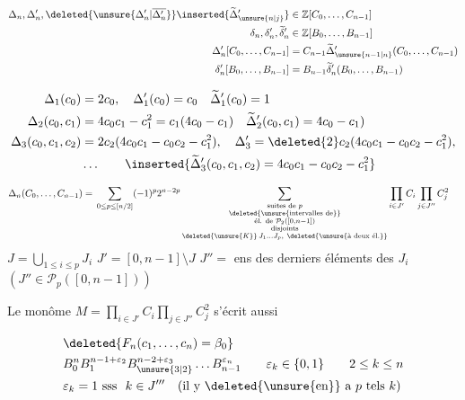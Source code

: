 \[
\begin{aligned}
\Delta_n,\Delta'_n,\deleted{\unsure{\Delta'_n|\overline{\Delta'_n}}}\inserted{\widetilde{\Delta}'_{\unsure{n|j}}}&\in\mathbb Z[C_0,\ldots,C_{n-1}]\\
\delta_n,\delta'_n,\widetilde{\delta}'_n&\in\mathbb Z[B_0,\ldots,B_{n-1}]\\
\Delta'_n[C_0,\ldots,C_{n-1}]&=C_{n-1}\widetilde{\Delta}'_{\unsure{n-1|n}}(C_0,\ldots,C_{n-1})\\
\delta'_n[B_0,\ldots,B_{n-1}]&=B_{n-1}\widetilde{\delta}'_n(B_0,\ldots,B_{n-1})
\end{aligned}
\]

\[
\begin{aligned}
\Delta_1(c_0)&=2c_0,\quad\Delta'_1(c_0)=c_0\quad\widetilde{\Delta}'_1(c_0)=1\\
\Delta_2(c_0,c_1)&=4c_0c_1-c_1^2=c_1(4c_0-c_1)\quad\widetilde{\Delta}'_2(c_0,c_1)=4c_0-c_1)\\
\Delta_3(c_0,c_1,c_2)&=2c_2(4c_0c_1-c_0c_2-c_1^2),\quad
\Delta'_3=\deleted{2}c_2(4c_0c_1-c_0c_2-c_1^2),\\
&\ldots\qquad\inserted{\widetilde{\Delta}'_3(c_0,c_1,c_2)=4c_0c_1-c_0c_2-c_1^2}
\end{aligned}
\]

\[
\begin{aligned}
\Delta_n(C_0,\ldots,C_{n-1})={}&\sum_{0\le p\le[n/2]}(-1)^p2^{n-2p}\sum_{\substack{\text{suites de }p\\\deleted{\unsure{\text{intervalles de}}}\\\text{él. de }\mathcal P_2([0,n-1])\\\text{disjoints}\\
\deleted{\unsure{K}}\,J_1\ldots J_p,\ \deleted{\unsure{\text{à deux él.}}}}}
\prod_{i\in J'}C_i\prod_{j\in J''}C_j^2
\end{aligned}
\]
$J=\bigcup_{1\le i\le p}J_i$ \quad $J'=[0,n-1]\setminus J$ \quad $J''=$ ens des derniers éléments des $J_i$ $(J''\in\mathcal P_p([0,n-1]))$


 Le monôme $M=\prod_{i\in J'}C_i\prod_{j\in J''}C_j^2$ s'écrit aussi

\[
\begin{aligned}
&\deleted{F_n(c_1,\ldots,c_n)=\beta_0}\\
&B_0^n B_1^{n-1+\varepsilon_2}B_{\unsure{3|2}}^{n-2+\varepsilon_3}\ldots B_{n-1}^{\varepsilon_n}
\qquad\varepsilon_k\in\{0,1\}\qquad2\le k\le n\\
&\varepsilon_k=1\ \text{sss }\ k\in J'''\quad\text{(il y \deleted{\unsure{en}} a $p$ tels $k$)}
\end{aligned}
\]

